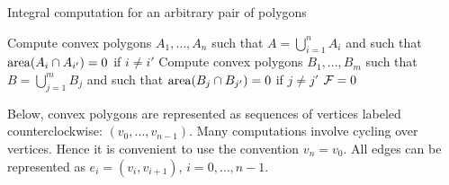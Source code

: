 
\begin{algorithm}
  \caption{Integral computation for an arbitrary pair of polygons}
  \label{algo:int:any:pair}
  Compute convex polygons $A_1,\ldots,A_n$ such that
  $A=\bigcup_{i=1}^n A_i$ and such that $\mathrm{area}(A_{i}\cap A_{i'})=0$ if
  $i\ne i'$\;
  Compute convex polygons $B_1,\ldots,B_m$ such that
  $B=\bigcup_{j=1}^m B_j$ and such that $\mathrm{area}(B_{j}\cap B_{j'})=0$ if
  $j\ne j'$\;
  ${\cal F}=0$\;
\end{algorithm}

Below, convex polygons are represented as sequences of vertices
labeled counterclockwise:
\newline
$(v_0,\ldots,v_{n-1})$.
Many computations
involve cycling over vertices. Hence it is convenient
to use the convention $v_n=v_0$. All edges can be represented as
$e_i=(v_i,v_{i+1})$, $i=0,\ldots,n-1$.



